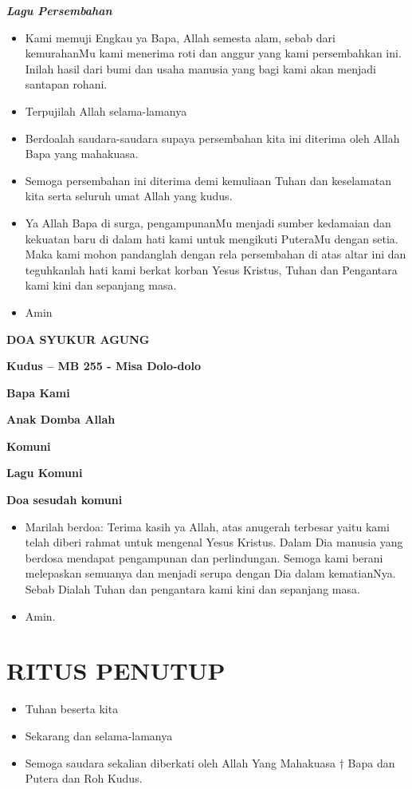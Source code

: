 \documentclass[a5paper,titlepage,10pt,openany]{scrbook}
\makeatletter
\newcommand{\subjudul}[1]{%
  {\parindent \z@ 
    \interlinepenalty\@M \bfseries #1\par\nobreak \vskip 10\p@ }}
\newcommand{\lagu}[1]{%
  {\parindent \z@ 
    \interlinepenalty\@M \slshape \bfseries \normalsize \textit{#1}\par\nobreak \vskip 10\p@ }}
\newcommand{\BU}[1]{\begin{itemize} \item[U:] #1 \end{itemize}}
\newcommand{\BI}[1]{\begin{itemize} \item[I:] #1 \end{itemize}}
\makeatother
\begin{document}
\lagu{Lagu Persembahan}

\BI{Kami memuji Engkau ya Bapa, Allah semesta alam, sebab 
dari kemurahanMu kami menerima roti dan anggur yang 
kami persembahkan ini. Inilah hasil dari bumi dan usaha 
manusia yang bagi kami akan menjadi santapan rohani.}

\BU{Terpujilah Allah selama-lamanya}

\BI{Berdoalah saudara-saudara supaya persembahan kita ini 
diterima oleh Allah Bapa yang mahakuasa.}

\BU{Semoga persembahan ini diterima demi kemuliaan Tuhan 
dan keselamatan kita serta seluruh umat Allah yang kudus.}

\BI{Ya Allah Bapa di surga, pengampunanMu menjadi sumber 
kedamaian dan kekuatan baru di dalam hati kami untuk 
mengikuti PuteraMu dengan setia. Maka kami mohon 
pandanglah dengan rela persembahan di atas altar ini dan 
teguhkanlah hati kami berkat korban Yesus Kristus, Tuhan 
dan Pengantara kami kini dan sepanjang masa.}

\BU{Amin} 

\subjudul{DOA SYUKUR AGUNG}


\subjudul{Kudus -- MB 255 - Misa Dolo-dolo}

\subjudul{Bapa Kami}

\subjudul{Anak Domba Allah}

\subjudul{Komuni}

\subjudul{Lagu Komuni}
 

\subjudul{Doa sesudah komuni}

\BI{Marilah berdoa: Terima kasih ya Allah, atas anugerah 
terbesar yaitu kami telah diberi rahmat untuk mengenal 
Yesus Kristus. Dalam Dia manusia yang berdosa mendapat 
pengampunan dan perlindungan. Semoga kami berani 
melepaskan semuanya dan menjadi serupa dengan Dia 
dalam kematianNya. Sebab Dialah Tuhan dan pengantara 
kami kini dan sepanjang masa.}

\BU{Amin.}

 

\section*{RITUS PENUTUP}

\BI{Tuhan beserta kita}

\BU{Sekarang dan selama-lamanya}

\BI{Semoga saudara sekalian diberkati oleh Allah Yang 
Mahakuasa † Bapa dan Putera dan Roh Kudus.}
\end{document}
